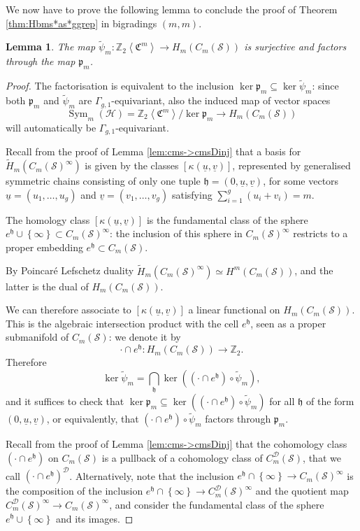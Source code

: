 \documentclass{amsart}
\theoremstyle{plain}
\newtheorem{lem}[thm]   {Lemma}
\theoremstyle{definition}
\newcommand{\cC}{\mathfrak{C}}
\newcommand{\D}{\mathcal{D}}
\renewcommand{\H}{\mathcal{H}}
\renewcommand{\S}{\mathcal{S}}
\newcommand{\Z}{\mathbb{Z}}
\renewcommand{\gg}{\Gamma_{g,1}}
\newcommand{\cms}{C_m(\S)}
\newcommand{\cmsD}{C_{m}^{\D}(\S)}
\newcommand{\pr}{\mathfrak{p}}
\newcommand{\tup}{\mathfrak{h}}
\newcommand{\tH}{\tilde{H}}
\newcommand{\ZcC}[1]{\Z_2\left<\cC^{#1}\right>}
\newcommand{\tpsi}{\tilde\psi}
\newcommand{\pa}[1]{\left(#1\right)}
\newcommand{\set}[1]{\left\{#1\right\}}
\newcommand{\uu}{\underline{u}}
\newcommand{\uv}{\underline{v}}
\DeclareMathOperator{\Sym}{Sym}
\begin{document}
We now have to prove the following lemma to conclude the proof of Theorem \ref{thm:Hbms*as*ggrep}
in bigradings $(m,m)$.
\begin{lem}
 \label{lem:tpsi->psi}
The map $\tpsi_m\colon\ZcC{m}\to H_m(\cms)$ is surjective and factors through the map $\pr_m$.
\end{lem}
\begin{proof}
The factorisation is equivalent to the inclusion $\ker\pr_m\subseteq\ker\tpsi_m$: since both
$\pr_m$ and $\tpsi_m$
are $\gg$-equivariant, also the induced map of vector spaces
\[
\Sym_m(\H)=\ZcC{m}/\ker\pr_m\to H_m(\cms)
\]
will automatically be
$\gg$-equivariant.

Recall from the proof of Lemma \ref{lem:cms->cmsDinj} that a basis for $\tH_m(\cms^{\infty})$ 
is given by the classes $[\kappa(\uu,\uv)]$, represented by generalised
symmetric chains consisting of only one tuple $\tup=(0,\uu,\uv)$, for some vectors
$\uu=(u_1,\dots,u_g)$ and $\uv=(v_1,\dots,v_g)$ satisfying $\sum_{i=1}^g(u_i+v_i)=m$.

The homology class
$[\kappa(\uu,\uv)]$ is the fundamental class
of the sphere $e^{\tup}\cup\set{\infty}\subset\cms^{\infty}$: the inclusion of this sphere in $\cms^{\infty}$
restricts to a proper embedding $e^{\tup}\subset\cms$.

By Poincaré Lefschetz duality $\tH_m(\cms^{\infty})\simeq H^m(\cms)$, and the latter is
the dual of $H_m(\cms)$.

We can therefore associate to $[\kappa(\uu,\uv)]$ a linear functional
on $H_m(\cms)$. This is the algebraic intersection product with the cell $e^{\tup}$, seen as a proper submanifold of $\cms$:
we denote it by
\[
 \cdot\cap e^{\tup}\colon H_m(\cms)\to\Z_2.
\]
Therefore
\[
 \ker\tpsi_m=\bigcap_{\tup}\ker\pa{(\cdot\cap e^{\tup})\circ\tpsi_m},
\]
and it suffices to check that $\ker\pr_m\subseteq\ker\pa{(\cdot\cap e^{\tup})\circ\tpsi_m}$
for all $\tup$ of the form $(0,\uu,\uv)$, or equivalently, that $(\cdot\cap e^{\tup})\circ\tpsi_m$ factors through $\pr_m$.

Recall from the proof of Lemma \ref{lem:cms->cmsDinj} that the cohomology class $(\cdot\cap e^{\tup})$ on $\cms$ is a pullback
of a cohomology class of $\cmsD$, that we call $(\cdot\cap e^{\tup})^{\D}$. Alternatively,
note that the inclusion $e^{\tup}\cap \set{\infty}\to\cms^{\infty}$ is the composition of the inclusion $e^{\tup}\cap\set{\infty}\to\cmsD^{\infty}$
and the quotient map $\cmsD^{\infty}\to\cms^{\infty}$, and consider the fundamental class of the sphere $e^{\tup}\cup\set{\infty}$ and its images.


\end{proof}
\end{document}
